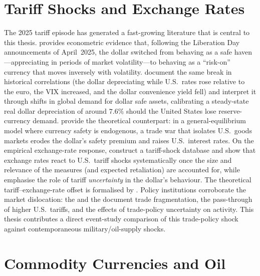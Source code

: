 \section{Tariff Shocks and Exchange Rates}
\label{sec:lit_tariffs}

The 2025 tariff episode has generated a fast-growing literature that is central to
this thesis. \textcite{kamin2025} provides econometric evidence that, following
the Liberation Day announcements of April~2025, the dollar switched from behaving
as a safe haven---appreciating in periods of market volatility---to behaving as a
``risk-on'' currency that moves inversely with volatility. \textcite{jiang2026}
document the same break in historical correlations (the dollar depreciating while
U.S.\ rates rose relative to the euro, the VIX increased, and the dollar
convenience yield fell) and interpret it through shifts in global demand for
dollar safe assets, calibrating a steady-state real dollar depreciation of around
$7.6\%$ should the United States lose reserve-currency demand. \textcite{hassan2025}
provide the theoretical counterpart: in a general-equilibrium model where currency
safety is endogenous, a trade war that isolates U.S.\ goods markets erodes the
dollar's safety premium and raises U.S.\ interest rates. On the empirical
exchange-rate response, \textcite{corsetti2025} construct a tariff-shock database
and show that exchange rates react to U.S.\ tariff shocks systematically once the
size and relevance of the measures (and expected retaliation) are accounted for,
while \textcite{kalemliozcan2026} emphasise the role of tariff \emph{uncertainty}
in the dollar's behaviour. The theoretical tariff--exchange-rate offset is
formalised by \textcite{itskhoki2025}. Policy institutions corroborate the market
dislocation: the \textcite{ecb2025fsr} and the \textcite{ecb2026bulletin} document
trade fragmentation, the pass-through of higher U.S.\ tariffs, and the effects of
trade-policy uncertainty on activity. This thesis contributes a direct event-study
comparison of this trade-policy shock against contemporaneous military/oil-supply
shocks.


\section{Commodity Currencies and Oil}
\label{sec:lit_commodities}


